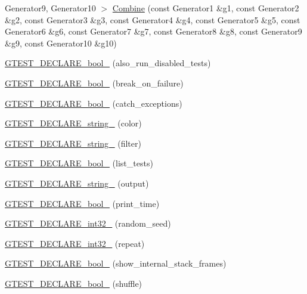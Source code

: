 \begin{DoxyCompactItemize}
\-Generator9, \-Generator10 $>$ \hyperlink{namespacetesting_a0590cd15c5bafaea9f5d2b1061e0a28b}{\-Combine} (const \-Generator1 \&g1, const \-Generator2 \&g2, const \-Generator3 \&g3, const \-Generator4 \&g4, const \-Generator5 \&g5, const \-Generator6 \&g6, const \-Generator7 \&g7, const \-Generator8 \&g8, const \-Generator9 \&g9, const \-Generator10 \&g10)
\item 
\hyperlink{namespacetesting_a1619f71d188a47c933c9563477c6cebf}{\-G\-T\-E\-S\-T\-\_\-\-D\-E\-C\-L\-A\-R\-E\-\_\-bool\-\_\-} (also\-\_\-run\-\_\-disabled\-\_\-tests)
\item 
\hyperlink{namespacetesting_a25fe4ea2fa2de9858abfaa1383892f90}{\-G\-T\-E\-S\-T\-\_\-\-D\-E\-C\-L\-A\-R\-E\-\_\-bool\-\_\-} (break\-\_\-on\-\_\-failure)
\item 
\hyperlink{namespacetesting_a6268f547a89a044ff6158fbfa0cab5cc}{\-G\-T\-E\-S\-T\-\_\-\-D\-E\-C\-L\-A\-R\-E\-\_\-bool\-\_\-} (catch\-\_\-exceptions)
\item 
\hyperlink{namespacetesting_ade7e561db85a5c2b87e9f0f66d4a4363}{\-G\-T\-E\-S\-T\-\_\-\-D\-E\-C\-L\-A\-R\-E\-\_\-string\-\_\-} (color)
\item 
\hyperlink{namespacetesting_a4c624a5efd425b1d1ec252507716c9e4}{\-G\-T\-E\-S\-T\-\_\-\-D\-E\-C\-L\-A\-R\-E\-\_\-string\-\_\-} (filter)
\item 
\hyperlink{namespacetesting_a503777cea079ba5720eaa67cc4bcf352}{\-G\-T\-E\-S\-T\-\_\-\-D\-E\-C\-L\-A\-R\-E\-\_\-bool\-\_\-} (list\-\_\-tests)
\item 
\hyperlink{namespacetesting_a0ad617a0f81de7dfb35c740f80d5812c}{\-G\-T\-E\-S\-T\-\_\-\-D\-E\-C\-L\-A\-R\-E\-\_\-string\-\_\-} (output)
\item 
\hyperlink{namespacetesting_ab8901f732d0e87e196184b5abac68bc9}{\-G\-T\-E\-S\-T\-\_\-\-D\-E\-C\-L\-A\-R\-E\-\_\-bool\-\_\-} (print\-\_\-time)
\item 
\hyperlink{namespacetesting_af66db99ad0d7a1453366804a03d887d6}{\-G\-T\-E\-S\-T\-\_\-\-D\-E\-C\-L\-A\-R\-E\-\_\-int32\-\_\-} (random\-\_\-seed)
\item 
\hyperlink{namespacetesting_a797265979cd4ed202c63419b29d26b9a}{\-G\-T\-E\-S\-T\-\_\-\-D\-E\-C\-L\-A\-R\-E\-\_\-int32\-\_\-} (repeat)
\item 
\hyperlink{namespacetesting_a2835c1783d75ac51afa600506ff5fff3}{\-G\-T\-E\-S\-T\-\_\-\-D\-E\-C\-L\-A\-R\-E\-\_\-bool\-\_\-} (show\-\_\-internal\-\_\-stack\-\_\-frames)
\item 
\hyperlink{namespacetesting_adba569244bbc9a07221d1abc81ea01dc}{\-G\-T\-E\-S\-T\-\_\-\-D\-E\-C\-L\-A\-R\-E\-\_\-bool\-\_\-} (shuffle)

\end{DoxyCompactItemize}
